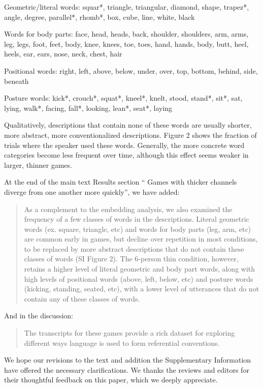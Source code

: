 \documentclass{stanfordletter}
\newcommand{\revised}[1]{\begin{quote}	#1 \end{quote}}
\begin{document}
\begin{letter}{}
{          	Geometric/literal words: squar*, triangle, triangular, diamond, shape, trapez*, angle, degree, parallel*, rhomb*, box, cube, line, white, black
          	
          	Words for body parts: face, head, heads, back, shoulder, shoulders, arm, arms, leg, legs, foot, feet, body, knee, knees, toe, toes, hand, hands, body, butt, heel, heels, ear, ears, nose, neck, chest, hair
          	
          	Positional words: right, left, above, below, under, over, top, bottom, behind, side, beneath
          	
          	Posture words: kick*, crouch*, squat*, kneel*, knelt, stood, stand*, sit*, sat, lying, walk*, facing, fall*, looking, lean*, seat*, laying
          	
          	Qualitatively, descriptions that contain none of these words are usually shorter, more abstract, more conventionalized descriptions. 
          	Figure 2 shows the fraction of trials where the speaker used these words. Generally, the more concrete word categories become less frequent over time, although this effect seems weaker in larger, thinner games. }
          
          At the end of the main text Results section `` Games with thicker channels diverge from one another more quickly'', we have added:
          
          \revised{As a complement to the embedding analysis, we also examined the frequency of a few classes of words in the descriptions. Literal geometric words (ex. square, triangle, etc) and words for body parts (leg, arm, etc) are common early in games, but decline over repetition in most conditions, to be replaced by more abstract descriptions that do not contain these classes of words (SI Figure 2). The 6-person thin condition, however, retains a higher level of literal geometric and body part words, along with high levels of positional words (above, left, below, etc) and posture words (kicking, standing, seated, etc), with a lower level of utterances that do not contain any of these classes of words.
          }
          
          And in the discussion:
          \revised{The transcripts for these games provide a rich dataset for exploring different ways language is used to form referential conventions. }
          
 We hope our revisions to the text and addition the Supplementary Information have offered the necessary clarifications. We thanks the reviews and editors for their thoughtful feedback on this paper, which we deeply appreciate. 
          

\end{letter}
\end{document}
